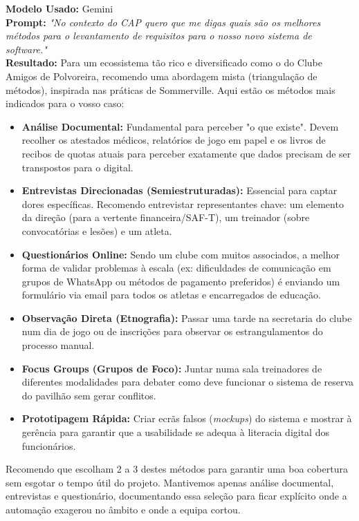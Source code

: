\documentclass[a4paper,12pt]{scrreprt}
\newcommand{\caixaprompt}[3]{
    \begin{tcolorbox}[
        enhanced,
        colback=azulclaro,      %
        colframe=blue!50!black, %
        arc=2mm,                %
        boxrule=0.5mm,          %
        title=\textbf{Documentação de IA}, %
        fonttitle=\sffamily,
        coltitle=black,
        attach title to upper,
        after title={\par\medskip},
    ]
        \textbf{Modelo Usado:} #1 \\
        \textbf{Prompt:} \textit{"#2"} \\
        \tcbline %
        \textbf{Resultado:} #3
    \end{tcolorbox}
}
\begin{document}
\caixaprompt{Gemini}{No contexto do CAP quero que me digas quais são os melhores métodos para o levantamento de requisitos para o nosso novo sistema de software.}{Para um ecossistema tão rico e diversificado como o do Clube Amigos de Polvoreira, recomendo uma abordagem mista (triangulação de métodos), inspirada nas práticas de Sommerville. Aqui estão os métodos mais indicados para o vosso caso:

\begin{itemize}
    \item \textbf{Análise Documental:} Fundamental para perceber "o que existe". Devem recolher os atestados médicos, relatórios de jogo em papel e os livros de recibos de quotas atuais para perceber exatamente que dados precisam de ser transpostos para o digital.
    
    \item \textbf{Entrevistas Direcionadas (Semiestruturadas):} Essencial para captar dores específicas. Recomendo entrevistar representantes chave: um elemento da direção (para a vertente financeira/SAF-T), um treinador (sobre convocatórias e lesões) e um atleta.
    
    \item \textbf{Questionários Online:} Sendo um clube com muitos associados, a melhor forma de validar problemas à escala (ex: dificuldades de comunicação em grupos de WhatsApp ou métodos de pagamento preferidos) é enviando um formulário via email para todos os atletas e encarregados de educação.
    
    \item \textbf{Observação Direta (Etnografia):} Passar uma tarde na secretaria do clube num dia de jogo ou de inscrições para observar os estrangulamentos do processo manual.
    
    \item \textbf{Focus Groups (Grupos de Foco):} Juntar numa sala treinadores de diferentes modalidades para debater como deve funcionar o sistema de reserva do pavilhão sem gerar conflitos.
    
    \item \textbf{Prototipagem Rápida:} Criar ecrãs falsos (\textit{mockups}) do sistema e mostrar à gerência para garantir que a usabilidade se adequa à literacia digital dos funcionários.
\end{itemize}

Recomendo que escolham 2 a 3 destes métodos para garantir uma boa cobertura sem esgotar o tempo útil do projeto. Mantivemos apenas análise documental, entrevistas e questionário, documentando essa seleção para ficar explícito onde a automação exagerou no âmbito e onde a equipa cortou.

}
\end{document}

